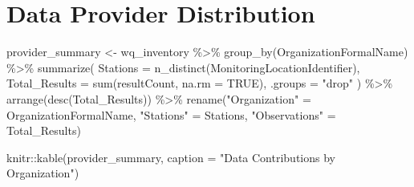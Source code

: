 \documentclass[
  letterpaper,
]{scrbook}
\newenvironment{Shaded}{\begin{snugshade}}{\end{snugshade}}
\newcommand{\AttributeTok}[1]{\textcolor[rgb]{0.40,0.45,0.13}{#1}}
\newcommand{\ConstantTok}[1]{\textcolor[rgb]{0.56,0.35,0.01}{#1}}
\newcommand{\FunctionTok}[1]{\textcolor[rgb]{0.28,0.35,0.67}{#1}}
\newcommand{\NormalTok}[1]{\textcolor[rgb]{0.00,0.23,0.31}{#1}}
\newcommand{\OtherTok}[1]{\textcolor[rgb]{0.00,0.23,0.31}{#1}}
\newcommand{\SpecialCharTok}[1]{\textcolor[rgb]{0.37,0.37,0.37}{#1}}
\newcommand{\StringTok}[1]{\textcolor[rgb]{0.13,0.47,0.30}{#1}}
\begin{document}
\section{Data Provider Distribution}\label{data-provider-distribution}

\begin{Shaded}
\begin{Highlighting}[]
\NormalTok{provider\_summary }\OtherTok{\textless{}{-}}\NormalTok{ wq\_inventory }\SpecialCharTok{\%\textgreater{}\%}
  \FunctionTok{group\_by}\NormalTok{(OrganizationFormalName) }\SpecialCharTok{\%\textgreater{}\%}
  \FunctionTok{summarize}\NormalTok{(}
    \AttributeTok{Stations =} \FunctionTok{n\_distinct}\NormalTok{(MonitoringLocationIdentifier),}
    \AttributeTok{Total\_Results =} \FunctionTok{sum}\NormalTok{(resultCount, }\AttributeTok{na.rm =} \ConstantTok{TRUE}\NormalTok{),}
    \AttributeTok{.groups =} \StringTok{"drop"}
\NormalTok{  ) }\SpecialCharTok{\%\textgreater{}\%}
  \FunctionTok{arrange}\NormalTok{(}\FunctionTok{desc}\NormalTok{(Total\_Results)) }\SpecialCharTok{\%\textgreater{}\%}
  \FunctionTok{rename}\NormalTok{(}\StringTok{"Organization"} \OtherTok{=}\NormalTok{ OrganizationFormalName, }\StringTok{"Stations"} \OtherTok{=}\NormalTok{ Stations, }\StringTok{"Observations"} \OtherTok{=}\NormalTok{ Total\_Results)}

\NormalTok{knitr}\SpecialCharTok{::}\FunctionTok{kable}\NormalTok{(provider\_summary, }\AttributeTok{caption =} \StringTok{"Data Contributions by Organization"}\NormalTok{)}
\end{Highlighting}
\end{Shaded}
\end{document}
